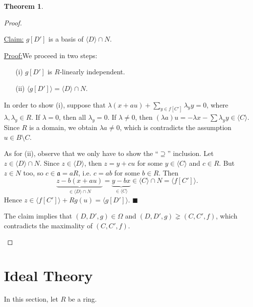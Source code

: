 \documentclass[12pt,a4paper]{report}
\theoremstyle{definition}
\newtheorem{theorem}{Theorem}[chapter] %
\theoremstyle{num.custom-title}
\newenvironment{claim}[1]{\par\noindent\underline{Claim#1:}\space}{} %
\newenvironment{claimproof}[1]{\par\noindent\underline{Proof:}\space#1}{\leavevmode\unskip\penalty9999 \hbox{}\nobreak\hfill\quad\hbox{$\blacksquare$}} %
\DeclareMathOperator{\sm}{\setminus}
\begin{document}
\begin{theorem}
\begin{proof}
\begin{enumerate}
\begin{claim}{}
$g[D']$ is a basis of $\langle D \rangle \cap N$.
\begin{claimproof}
We proceed in two steps:
\begin{enumerate}
\item[(i)] $g[D']$ is $R$-linearly independent.
\item[(ii)] $\langle g[D'] \rangle = \langle D \rangle \cap N$.
\end{enumerate}
In order to show (i), suppose that $\lambda(x+au) + \sum_{y \in f[C']} \lambda_y y =0$, where $\lambda,\lambda_y \in R$. If $\lambda = 0$, then all $\lambda_y = 0$. If $\lambda \neq 0$, then $(\lambda a) u = -\lambda x - \sum \lambda_y y \in \langle C \rangle$. Since $R$ is a domain, we obtain $\lambda a \neq 0$, which is contradicts the assumption $u \in B \sm C$.

As for (ii), observe that we only have to show the ``$\supseteq$'' inclusion. Let $z \in \langle D \rangle \cap N$. Since $z \in \langle D \rangle$, then $z = y+cu$ for some $y \in \langle C \rangle$ and $c \in R$. But $z \in N$ too, so $c \in \mathfrak{a} = aR$, i.e. $c=ab$ for some $b \in R$. Then 
\[
\underbrace{z-b(x+au)}_{\in \langle D \rangle \cap N} = \underbrace{y-bx}_{\in \langle C \rangle} \in \langle C \rangle \cap N = \langle f[C'] \rangle.
\]
Hence $z \in \langle f[C'] \rangle + R g(u) = \langle g[D'] \rangle$.
\end{claimproof}
\end{claim}

The claim implies that $(D,D',g) \in \Omega$ and $(D,D',g) \gneq (C,C',f)$, which contradicts the maximality of $(C,C',f)$.
\end{enumerate}
\end{proof}
\end{theorem}






















\chapter{Ideal Theory}

In this section, let $R$ be a ring.
\end{document}
